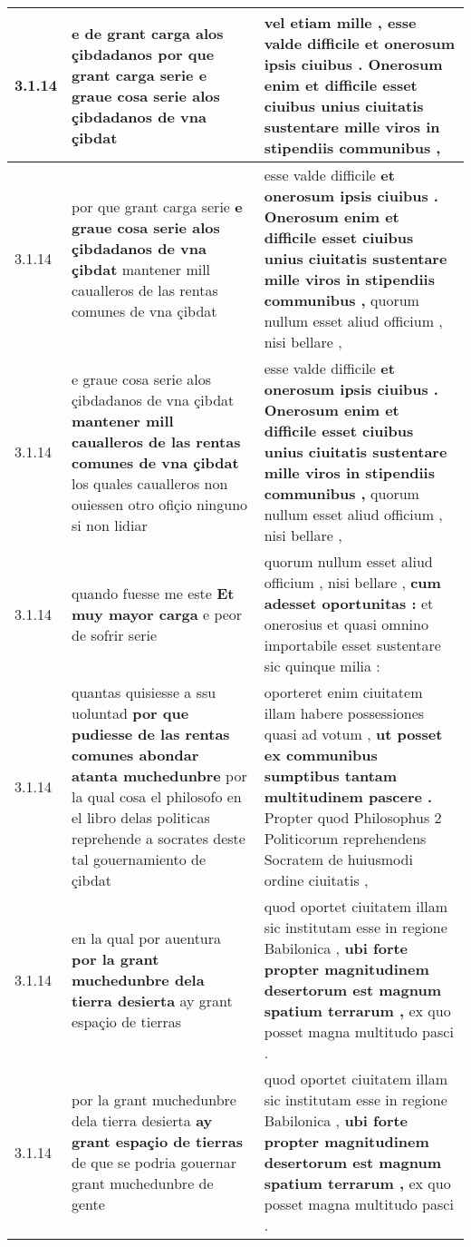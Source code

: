 \begin{tabular}{|p{1cm}|p{6.5cm}|p{6.5cm}|}
3.1.14 & e de grant carga alos çibdadanos \textbf{ por que grant carga serie } e graue cosa serie alos çibdadanos de vna çibdat & vel etiam mille , \textbf{ esse valde difficile } et onerosum ipsis ciuibus . Onerosum enim et difficile esset ciuibus unius ciuitatis sustentare mille viros in stipendiis communibus , \\\hline
3.1.14 & por que grant carga serie \textbf{ e graue cosa serie alos çibdadanos de vna çibdat } mantener mill caualleros de las rentas comunes de vna çibdat & esse valde difficile \textbf{ et onerosum ipsis ciuibus . Onerosum enim et difficile esset ciuibus unius ciuitatis sustentare mille viros in stipendiis communibus , } quorum nullum esset aliud officium , nisi bellare , \\\hline
3.1.14 & e graue cosa serie alos çibdadanos de vna çibdat \textbf{ mantener mill caualleros de las rentas comunes de vna çibdat } los quales caualleros non ouiessen otro ofiçio ninguno si non lidiar & esse valde difficile \textbf{ et onerosum ipsis ciuibus . Onerosum enim et difficile esset ciuibus unius ciuitatis sustentare mille viros in stipendiis communibus , } quorum nullum esset aliud officium , nisi bellare , \\\hline
3.1.14 & quando fuesse me este \textbf{ Et muy mayor carga } e peor de sofrir serie & quorum nullum esset aliud officium , nisi bellare , \textbf{ cum adesset oportunitas : } et onerosius et quasi omnino importabile esset sustentare sic quinque milia : \\\hline
3.1.14 & quantas quisiesse a ssu uoluntad \textbf{ por que pudiesse de las rentas comunes abondar atanta muchedunbre } por la qual cosa el philosofo en el libro delas politicas reprehende a socrates deste tal gouernamiento de çibdat & oporteret enim ciuitatem illam habere possessiones quasi ad votum , \textbf{ ut posset ex communibus sumptibus tantam multitudinem pascere . } Propter quod Philosophus 2 Politicorum reprehendens Socratem de huiusmodi ordine ciuitatis , \\\hline
3.1.14 & en la qual por auentura \textbf{ por la grant muchedunbre dela tierra desierta } ay grant espaçio de tierras & quod oportet ciuitatem illam sic institutam esse in regione Babilonica , \textbf{ ubi forte propter magnitudinem desertorum est magnum spatium terrarum , } ex quo posset magna multitudo pasci . \\\hline
3.1.14 & por la grant muchedunbre dela tierra desierta \textbf{ ay grant espaçio de tierras } de que se podria gouernar grant muchedunbre de gente & quod oportet ciuitatem illam sic institutam esse in regione Babilonica , \textbf{ ubi forte propter magnitudinem desertorum est magnum spatium terrarum , } ex quo posset magna multitudo pasci . \\\hline

\end{tabular}
